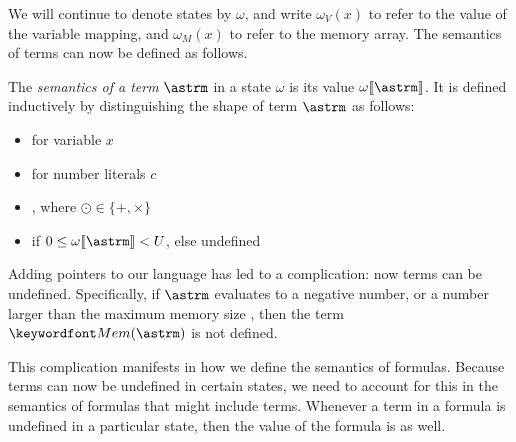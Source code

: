\documentclass[11pt,twoside]{scrartcl}
\begin{document}
We will continue to denote states by $\omega$, and write $\omega_V(x)$ to refer to the value of the variable mapping, and $\omega_M(x)$ to refer to the memory array. The semantics of terms can now be defined as follows.
\begin{definition}
\label{def:term-semantics}
The \emph{semantics of a term} $\astrm$ in a state $\omega$ is its value $\omega\llbracket\astrm\rrbracket$.
It is defined inductively by distinguishing the shape of term $\astrm$ as follows:
\begin{itemize}
  \item {} for variable $x$
  \item {} for number literals $c$
  \item \m{\omega\llbracket\astrm\odot\bstrm\rrbracket = \omega\llbracket\astrm\rrbracket \odot \omega\llbracket\bstrm\rrbracket}, where $\odot \in \{+,\times\}$
  \item {} if $0 \le \omega\llbracket\astrm\rrbracket < \maxmem$, else undefined
\end{itemize}
\end{definition}
Adding pointers to our language has led to a complication: now terms can be undefined. Specifically, if $\astrm$ evaluates to a negative number, or a number larger than the maximum memory size \maxmem, then the term $\pderef{\astrm}$ is not defined.

This complication manifests in how we define the semantics of formulas. Because terms can now be undefined in certain states, we need to account for this in the semantics of formulas that might include terms. Whenever a term in a formula is undefined in a particular state, then the value of the formula is as well.
\end{document}
